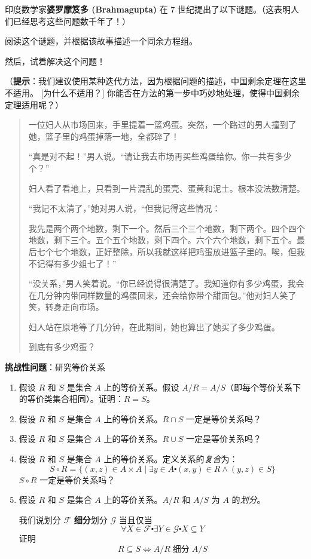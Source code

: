 \begin{exercise}
    印度数学家\textbf{婆罗摩笈多 (Brahmagupta)} 在 $7$ 世纪提出了以下谜题。（这表明人们已经思考这些问题数千年了！）

    阅读这个谜题，并根据该故事描述一个同余方程组。

    然后，试着解决这个问题！

    （\textbf{提示}：我们建议使用某种迭代方法，因为根据问题的描述，中国剩余定理在这里不适用。 [为什么不适用？] 你能否在方法的第一步中巧妙地处理，使得中国剩余定理适用呢？）

    \begin{quote}
        一位妇人从市场回来，手里提着一篮鸡蛋。突然，一个路过的男人撞到了她，篮子里的鸡蛋掉落一地，全都碎了！

        ``真是对不起！''男人说。``请让我去市场再买些鸡蛋给你。你一共有多少个？''

        妇人看了看地上，只看到一片混乱的蛋壳、蛋黄和泥土。根本没法数清楚。

        ``我记不太清了，''她对男人说，``但我记得这些情况：

        我先是两个两个地数，剩下一个。然后三个三个地数，剩下两个。四个四个地数，剩下三个。五个五个地数，剩下四个。六个六个地数，剩下五个。最后七个七个地数，正好整除，所以我就这样把鸡蛋放进篮子里的。唉，但我不记得有多少组七了！''

        ``没关系，''男人笑着说。``你已经说得很清楚了。我知道你有多少鸡蛋，我会在几分钟内带同样数量的鸡蛋回来，还会给你带个甜面包。''他对妇人笑了笑，转身走向市场。

        妇人站在原地等了几分钟，在此期间，她也算出了她买了多少鸡蛋。

        到底有多少鸡蛋？
    \end{quote}
\end{exercise}

\begin{exercise}
    \textbf{挑战性问题}：研究等价关系
    \begin{enumerate}[label=(\alph*)]
        \item 假设 $R$ 和 $S$ 是集合 $A$ 上的等价关系。假设 $A/R = A/S$（即每个等价关系下的等价类集合相同）。证明：$R = S$。
        \item 假设 $R$ 和 $S$ 是集合 $A$ 上的等价关系。$R \cap S$ 一定是等价关系吗？
        \item 假设 $R$ 和 $S$ 是集合 $A$ 上的等价关系。$R \cup S$ 一定是等价关系吗？
        \item 假设 $R$ 和 $S$ 是集合 $A$ 上的等价关系。定义关系的\emph{复合}为：
            \[S \circ R = \{(x, z) \in A \times A \mid \exists y \in A \centerdot (x, y) \in R \land (y, z) \in S\}\]
            $S \circ R$ 一定是等价关系吗？
        \item 假设 $R$ 和 $S$ 是集合 $A$ 上的等价关系。$A/R$ 和 $A/S$ 为 $A$ 的\emph{划分}。
        
            我们说划分 $\mathcal{F}$ \textbf{细分}划分 $\mathcal{G}$ 当且仅当
            \[\forall X \in \mathcal{F} \centerdot \exists Y \in \mathcal{G} \centerdot X \subseteq Y\]
            证明
            \[R \subseteq S \iff A/R \;\text{细分}\; A/S\]
    \end{enumerate}
\end{exercise}